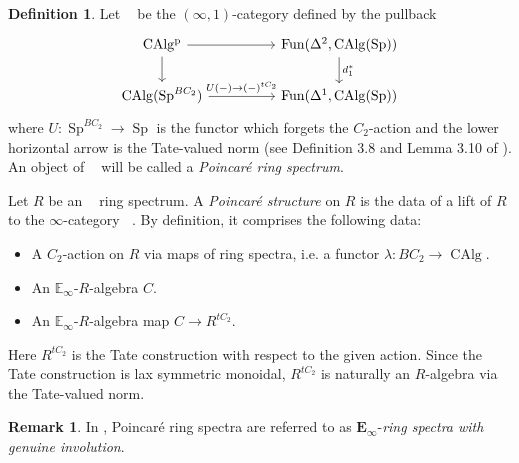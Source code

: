 \documentclass{article}
\DeclareMathOperator{\CAlg}{CAlg} %
\DeclareMathOperator{\CAlgp}{CAlg^p} %
\DeclareMathOperator{\Einfty}{\mathbf{E}_\infty} %
\DeclareMathOperator{\Spectra}{Sp} %
\newcommand{\EE}{\mathbb{E}}
\theoremstyle{definition}
\newtheorem{definition}[equation]{Definition}
\newtheorem{remark}[equation]{Remark}
\newcommand{\Viktor}[1]{\todo{V: #1}}
\begin{document}
\begin{definition}
    \label{definition:poincare_ring_spectrum}
    Let $\CAlgp$ be the $(\infty,1)$-category defined by the pullback 
    \begin{equation}\label{diagram:poincare_ring_defn}    
    \begin{tikzcd}
    \CAlgp \arrow[rr]\arrow[d] & & \operatorname{Fun}(\Delta^2, \CAlg(\Spectra))\arrow[d,"d_1^*"]\\
    \CAlg(\Spectra^{BC_2})\arrow[rr,"U(-)\to (-)^{tC_2}"] & & \operatorname{Fun}(\Delta^1, \CAlg(\Spectra))
    \end{tikzcd}
    \end{equation}
    where $U:\Spectra^{BC_2}\to \Spectra$ is the functor which forgets the $C_2$-action and the lower horizontal arrow is the Tate-valued norm (see Definition 3.8 and Lemma 3.10 of \cite{LYang_normedrings}). 
    An object of $ \CAlgp $ will be called a \emph{Poincaré ring spectrum}.

    Let $R$ be an $ \Einfty $ ring spectrum. 
    A \emph{Poincaré structure} on $R$ is the data of a lift of $ R $ to the $ \infty $-category $ \CAlgp $. 
    By definition, it comprises the following data:
    \begin{itemize}
        \item A $C_2$-action on $R$ via maps of ring spectra, i.e. a functor $\lambda: BC_2\rightarrow \CAlg$.
        \item An $ \EE_\infty $-$R$-algebra $ C$.
        \item An $ \EE_\infty $-$R$-algebra map $C\rightarrow R^{tC_2}$. 
    \end{itemize}
    Here $R^{tC_2}$ is the Tate construction with respect to the given action. 
    Since the Tate construction is lax symmetric monoidal, $R^{tC_2}$ is naturally an $R$-algebra via the Tate-valued norm. 
\end{definition}

\begin{remark}
    \label{remark:notational_difference_to_nine-authored_papers}
    In \cite[discussion immediately preceding Examples 5.4.10]{CDHHLMNNSI}, Poincaré ring spectra are referred to as $\mathbf{E}_\infty$-\emph{ring spectra with genuine involution}.
\end{remark}
\end{document}
